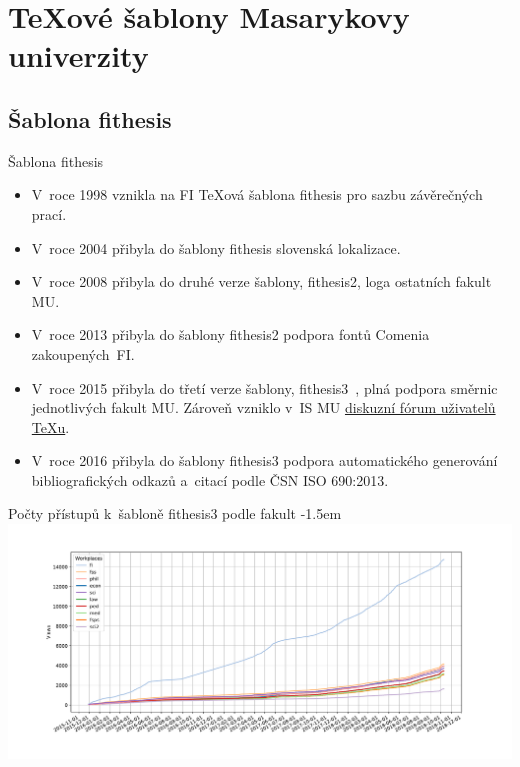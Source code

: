 \documentclass[
  aspectratio=169,
]{beamer}
\makeatletter
\newcommand\odkaz[2]{\textcolor{mubeamer@base}{\href{#1}{#2}}}
\makeatother
\begin{document}
\section[\TeX ové šablony MU]{\TeX ové šablony Masarykovy univerzity}
\subsection{Šablona fithesis}

\begin{frame}{Šablona fithesis}
\begin{itemize}
\item V~roce 1998 vznikla na FI \TeX ová \alert{šablona fithesis pro sazbu závěrečných prací}.
\item V~roce 2004 přibyla do šablony fithesis slovenská lokalizace.
\item V~roce 2008 přibyla do druhé verze šablony, \alert{fithesis2, loga ostatních fakult MU}.
\item V~roce 2013 přibyla do šablony fithesis2 podpora fontů Comenia zakoupených~FI.
\item V~roce 2015 přibyla do třetí verze šablony, \alert{fithesis3~\cite{novotny15}, plná podpora směrnic jednotlivých fakult MU}. Zároveň vzniklo v~IS MU \odkaz{https://is.muni.cz/auth/df/fithesis-sazba/}{diskuzní fórum uživatelů \TeX u}.
\item V~roce 2016 přibyla do šablony fithesis3 podpora automatického generování bibliografických odkazů a~citací podle ČSN ISO 690:2013.
\end{itemize}
\end{frame}

\begin{frame}{Počty přístupů k~šabloně fithesis3 podle fakult}
\kern-1.5em\leavevmode{}\textwidth\relax
\includegraphics[width=1.1\textwidth]{figs/fithesis}
\end{frame}
\end{document}
